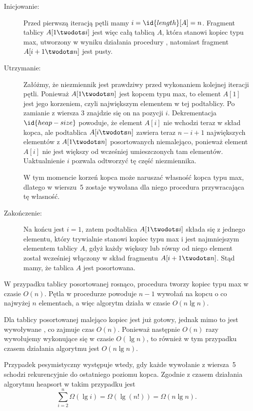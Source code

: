 \exercise %
\begin{description}
	\item[Inicjowanie:] Przed pierwszą iteracją pętli mamy $i=\id{length}[A]=n$. Fragment tablicy $A[1\twodots i]$ jest więc całą tablicą $A$, która stanowi kopiec typu max, utworzony w wyniku działania procedury , natomiast fragment $A[i+1\twodots n]$ jest pusty.
	\item[Utrzymanie:] Załóżmy, że niezmiennik jest prawdziwy przed wykonaniem kolejnej iteracji pętli. Ponieważ $A[1\twodots n]$ jest kopcem typu max, to element $A[1]$ jest jego korzeniem, czyli największym elementem w tej podtablicy. Po zamianie z wiersza 3 znajdzie się on na pozycji $i$. Dekrementacja $\id{heap-size}$ powoduje, że element $A[i]$ nie wchodzi teraz w skład kopca, ale podtablica $A[i\twodots n]$ zawiera teraz $n-i+1$ największych elementów z $A[1\twodots n]$ posortowanych niemalejąco, ponieważ element $A[i]$ nie jest większy od wcześniej umieszczonych tam elementów. Uaktualnienie $i$ pozwala odtworzyć tę część niezmiennika.

	W tym momencie korzeń kopca może naruszać własność kopca typu max, dlatego w wierszu~5 zostaje wywołana dla niego procedura  przywracająca tę własność.
	\item[Zakończenie:] Na końcu jest $i=1$, zatem podtablica $A[1\twodots i]$ składa się z jednego elementu, który trywialnie stanowi kopiec typu max i jest najmniejszym elementem tablicy $A$, gdyż każdy większy lub równy od niego element został wcześniej włączony w skład fragmentu $A[i+1\twodots n]$. Stąd mamy, że tablica $A$ jest posortowana.
\end{description}

\exercise %
W przypadku tablicy posortowanej rosnąco, procedura  tworzy kopiec typu max w czasie $O(n)$. Pętla w procedurze  powoduje $n-1$ wywołań  na kopcu o co najwyżej $n$ elementach, a więc algorytm działa w czasie $O(n\lg n)$.

Dla tablicy posortowanej malejąco kopiec jest już gotowy, jednak mimo to jest wywoływane , co zajmuje czas $O(n)$. Ponieważ następnie $O(n)$ razy wywołujemy  wykonujące się w czasie $O(\lg n)$, to również w tym przypadku czasem działania algorytmu jest $O(n\lg n)$.

\exercise %
Przypadek pesymistyczny występuje wtedy, gdy każde wywołanie  z wiersza~5 schodzi rekurencyjnie do ostatniego poziomu kopca. Zgodnie z  czasem działania algorytmu heapsort w takim przypadku jest
\[
	\sum_{i=2}^{n}\Omega(\lg i) = \Omega(\lg(n!)) = \Omega(n\lg n).
\]

